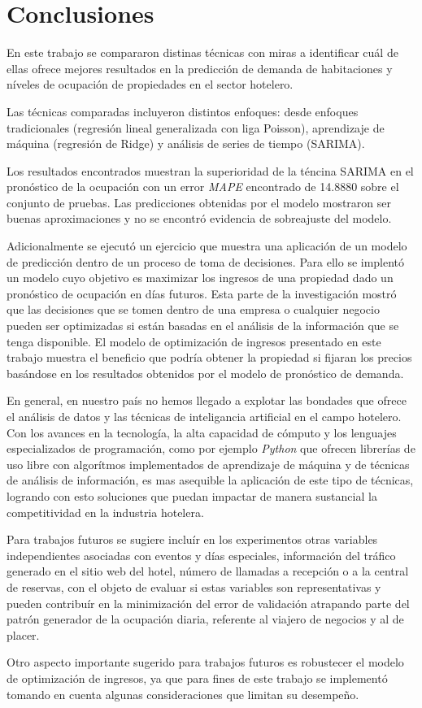 \chapter{Conclusiones}
\label{ch:conclusiones}

En este trabajo se compararon distinas técnicas con miras a identificar cuál de ellas ofrece mejores resultados en la predicción de demanda de habitaciones y níveles de ocupación de propiedades en el sector hotelero.

Las técnicas comparadas incluyeron distintos enfoques: desde enfoques tradicionales (regresión lineal generalizada con liga Poisson), aprendizaje de máquina (regresión de Ridge) y análisis de series de tiempo (SARIMA). 

Los resultados encontrados muestran la superioridad de la téncina SARIMA en el pronóstico de la ocupación con un error \emph{MAPE} encontrado de 14.8880 sobre el conjunto de pruebas. Las predicciones obtenidas por el modelo mostraron ser buenas aproximaciones y no se encontró evidencia de sobreajuste del modelo.

Adicionalmente se ejecutó un ejercicio que muestra una aplicación de un modelo de predicción dentro de un proceso de toma de decisiones. Para ello se implentó un modelo cuyo objetivo es maximizar los ingresos de una propiedad dado un pronóstico de ocupación en días futuros. Esta parte de la investigación mostró que las decisiones que se tomen dentro de una empresa o cualquier negocio pueden ser optimizadas si están basadas en el análisis de la información que se tenga disponible. El modelo de optimización de ingresos presentado en este trabajo muestra el beneficio que podría obtener la propiedad si fijaran los precios basándose en los resultados obtenidos por el modelo de pronóstico de demanda.

En general, en nuestro país no hemos llegado a explotar las bondades que ofrece el análisis de datos y las técnicas de inteligancia artificial en el campo hotelero. Con los avances en la tecnología, la alta capacidad de cómputo y los lenguajes especializados de programación, como por ejemplo \emph{Python} que ofrecen librerías de uso libre con algorítmos implementados de aprendizaje de máquina y de técnicas de análisis de información, es mas asequible la aplicación de este tipo de técnicas, logrando con esto soluciones que puedan impactar de manera sustancial la competitividad en la industria hotelera.

Para trabajos futuros se sugiere incluír en los experimentos otras variables independientes asociadas con eventos y días especiales, información del tráfico generado en el sitio web del hotel, número de llamadas a recepción o a la central de reservas, con el objeto de evaluar si estas variables son representativas y pueden contribuír en la minimización del error de validación atrapando parte del patrón generador de la ocupación diaria, referente al viajero de negocios y al de placer.

Otro aspecto importante sugerido para trabajos futuros es robustecer el modelo de optimización de ingresos, ya que para fines de este trabajo se implementó tomando en cuenta algunas consideraciones que limitan su desempeño.


